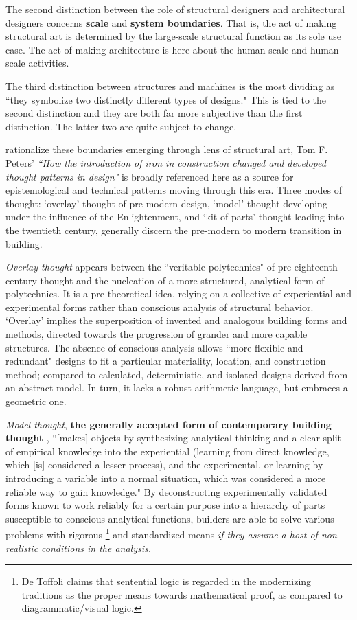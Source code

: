 The second distinction between the role of structural designers and architectural designers concerns \textbf{scale} and \textbf{system boundaries}. That is, the act of making structural art is determined by the large-scale structural function as its sole use case. The act of making architecture is here about the human-scale and human-scale activities.

The third distinction between structures and machines is the most dividing as ``they symbolize two distinctly different types of designs." This is tied to the second distinction and they are both far more subjective than the first distinction. The latter two are quite subject to change.


rationalize these boundaries emerging through lens of structural art, Tom F. Peters' \textit{``How the introduction of iron in construction changed and developed thought patterns in design"} is broadly referenced here as a source for epistemological and technical patterns moving through this era. Three modes of thought: `overlay' thought \cite[36]{IRON} of pre-modern design, `model' thought \cite[37]{IRON} developing under the influence of the Enlightenment, and `kit-of-parts' thought \cite[53]{IRON} leading into the twentieth century, generally discern the pre-modern to modern transition in building.

\textit{Overlay thought} appears between the ``veritable polytechnics" of pre-eighteenth century thought and the nucleation of a more structured, analytical form of polytechnics. It is a pre-theoretical idea, relying on a collective of experiential and experimental forms rather than conscious analysis of structural behavior. `Overlay' implies the superposition of invented and analogous building forms and methods, directed towards the progression of grander and more capable structures. The absence of conscious analysis allows ``more flexible and redundant" designs to fit a particular materiality, location, and construction method; compared to calculated, deterministic, and isolated designs derived from an abstract model. \cite[p36, 37]{IRON} In turn, it lacks a robust arithmetic language, but embraces a geometric one.

\textit{Model thought}, \textbf{the generally accepted form of contemporary building thought} \cite[p38]{IRON}, ``[makes] objects by synthesizing analytical thinking and a clear split of empirical knowledge into the experiential (learning from direct knowledge, which [is] considered a lesser process), and the experimental, or learning by introducing a variable into a normal situation, which was considered a more reliable way to gain knowledge." \cite[p39]{IRON} By deconstructing experimentally validated forms known to work reliably for a certain purpose into a hierarchy of parts susceptible to conscious analytical functions, builders are able to solve various problems with rigorous \footnote{De Toffoli claims that sentential logic is regarded in the modernizing traditions as the proper means towards mathematical proof, as compared to diagrammatic/visual logic.} and standardized means \textit{if they assume a host of non-realistic conditions in the analysis.}

